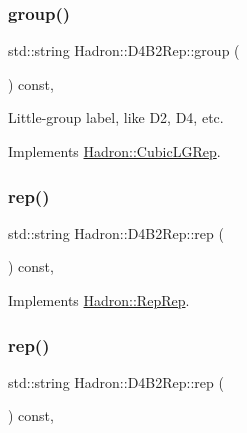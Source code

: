 \subsubsection{\texorpdfstring{group()}{group()}\hspace{0.1cm}{\footnotesize\ttfamily [3/3]}}
{\footnotesize\ttfamily std\+::string Hadron\+::\+D4\+B2\+Rep\+::group (\begin{DoxyParamCaption}{ }\end{DoxyParamCaption}) const\hspace{0.3cm}{\ttfamily [inline]}, {\ttfamily [virtual]}}

Little-\/group label, like D2, D4, etc. 

Implements \mbox{\hyperlink{structHadron_1_1CubicLGRep_a9bdb14b519a611d21379ed96a3a9eb41}{Hadron\+::\+Cubic\+L\+G\+Rep}}.

\mbox{\label{structHadron_1_1D4B2Rep_ac78aafe72fe015abb9639b5c380be490}} 
\subsubsection{\texorpdfstring{rep()}{rep()}\hspace{0.1cm}{\footnotesize\ttfamily [1/3]}}
{\footnotesize\ttfamily std\+::string Hadron\+::\+D4\+B2\+Rep\+::rep (\begin{DoxyParamCaption}{ }\end{DoxyParamCaption}) const\hspace{0.3cm}{\ttfamily [inline]}, {\ttfamily [virtual]}}



Implements \mbox{\hyperlink{structHadron_1_1RepRep_ab3213025f6de249f7095892109575fde}{Hadron\+::\+Rep\+Rep}}.

\mbox{\label{structHadron_1_1D4B2Rep_ac78aafe72fe015abb9639b5c380be490}} 
\subsubsection{\texorpdfstring{rep()}{rep()}\hspace{0.1cm}{\footnotesize\ttfamily [2/3]}}
{\footnotesize\ttfamily std\+::string Hadron\+::\+D4\+B2\+Rep\+::rep (\begin{DoxyParamCaption}{ }\end{DoxyParamCaption}) const\hspace{0.3cm}{\ttfamily [inline]}, {\ttfamily [virtual]}}



